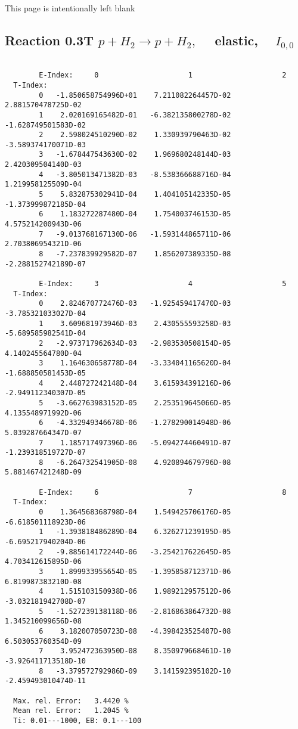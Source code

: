\newpage
This page is intentionally left blank
\newpage


\subsection{
Reaction 0.3T  $p + H_2 \rightarrow  p + H_2 ,\quad$  elastic,
$\quad I_{0,0}$
}

\begin{verbatim}

        E-Index:     0                     1                     2
  T-Index:
        0   -1.850658754996D+01    7.211082264457D-02    2.881570478725D-02
        1    2.020169165482D-01   -6.382135800278D-02   -1.628749501583D-02
        2    2.598024510290D-02    1.330939790463D-02   -3.589374170071D-03
        3   -1.678447543630D-02    1.969680248144D-03    2.420309504140D-03
        4   -3.805013471382D-03   -8.538366688716D-04    1.219958125509D-04
        5    5.832875302941D-04    1.404105142335D-05   -1.373999872185D-04
        6    1.183272287480D-04    1.754003746153D-05    4.575214200943D-06
        7   -9.013768167130D-06   -1.593144865711D-06    2.703806954321D-06
        8   -7.237839929582D-07    1.856207389335D-08   -2.288152742189D-07

        E-Index:     3                     4                     5
  T-Index:
        0    2.824670772476D-03   -1.925459417470D-03   -3.785321033027D-04
        1    3.609681973946D-03    2.430555593258D-03   -5.689585982541D-04
        2   -2.973717962634D-03   -2.983530508154D-05    4.140245564780D-04
        3    1.164630658778D-04   -3.334041165620D-04   -1.688850581453D-05
        4    2.448727242148D-04    3.615934391216D-06   -2.949112340307D-05
        5   -3.662763983152D-05    2.253519645066D-05    4.135548971992D-06
        6   -4.332949346678D-06   -1.278290014948D-06    5.039287664347D-07
        7    1.185717497396D-06   -5.094274460491D-07   -1.239318519727D-07
        8   -6.264732541905D-08    4.920894679796D-08    5.881467421248D-09

        E-Index:     6                     7                     8
  T-Index:
        0    1.364568368798D-04    1.549425706176D-05   -6.618501118923D-06
        1   -1.393818486289D-04    6.326271239195D-05   -6.695217940204D-06
        2   -9.885614172244D-06   -3.254217622645D-05    4.703412615895D-06
        3    1.899933955654D-05   -1.395858712371D-06    6.819987383210D-08
        4    1.515103150938D-06    1.989212957512D-06   -3.032181942708D-07
        5   -1.527239138118D-06   -2.816863864732D-08    1.345210099656D-08
        6    3.182007050723D-08   -4.398423525407D-08    6.503053760354D-09
        7    3.952472363950D-08    8.350979668461D-10   -3.926411713518D-10
        8   -3.379572792986D-09    3.141592395102D-10   -2.459493010474D-11

  Max. rel. Error:   3.4420 %
  Mean rel. Error:   1.2045 %
  Ti: 0.01---1000, EB: 0.1---100
\end{verbatim}

